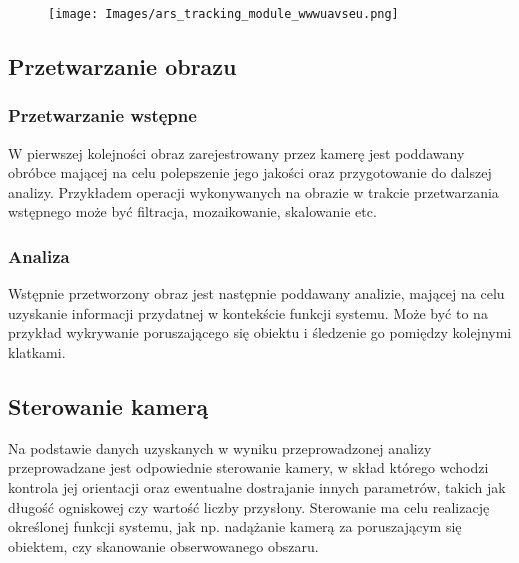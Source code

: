 \begin{figure}[!htb]
	\centering
	\texttt{[image: Images/ars\_tracking\_module\_wwwuavseu.png]} 
	\label{img:ARS_head}
\end{figure}

\subsection{Przetwarzanie obrazu}
\label{subsec:przetwObrazu}
\subsubsection{Przetwarzanie wstępne}
\label{subsubsec:przetwWst}
W pierwszej kolejności obraz zarejestrowany przez kamerę jest poddawany obróbce mającej na celu polepszenie jego jakości oraz przygotowanie do dalszej analizy. Przykładem operacji wykonywanych na obrazie w trakcie przetwarzania wstępnego może być filtracja, mozaikowanie, skalowanie etc.
\subsubsection{Analiza}
\label{subsubsec:analiza}
Wstępnie przetworzony obraz jest następnie poddawany analizie, mającej na celu uzyskanie informacji przydatnej w kontekście funkcji systemu. Może być to na przykład wykrywanie poruszającego się obiektu i śledzenie go pomiędzy kolejnymi klatkami. 

\subsection{Sterowanie kamerą}
Na podstawie danych uzyskanych w wyniku przeprowadzonej analizy przeprowadzane jest odpowiednie sterowanie kamery, w skład którego wchodzi kontrola jej orientacji oraz ewentualne dostrajanie innych parametrów, takich jak długość ogniskowej czy wartość liczby przysłony. Sterowanie ma celu realizację określonej funkcji systemu, jak np. nadążanie kamerą za poruszającym się obiektem, czy skanowanie obserwowanego obszaru.
